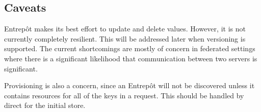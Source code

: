 \subsection{Caveats}

Entrep\^ot makes its best effort to update and delete values.  However, it is not currently completely resilient.  This will be addressed later when versioning is supported.  The current shortcomings are mostly of concern in federated settings where there is a significant likelihood that communication between two servers is significant.

Provisioning is also a concern, since an Entrep\^ot \agent{} will not be discovered unless it contains resources for all of the keys in a request.  This should be handled by direct \operations{} for the initial store.
